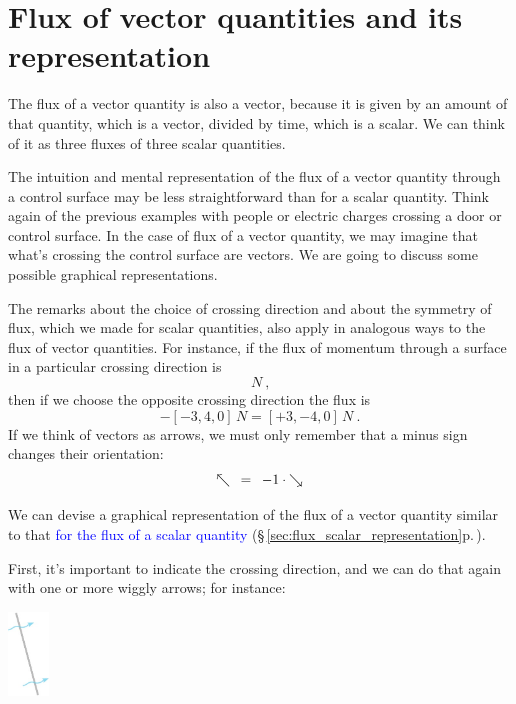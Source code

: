 \documentclass[a4paper,12pt,%
onecolumn,oneside,%
british%
]{memoir}
\renewcommand*{\|}[1][]{\nonscript\:#1\vert\nonscript\:\mathopen{}}
\newcommand*{\sect}{\S}%
\renewcommand*{\autoref}[3][\sect\,\ref]{\textcolor{blue}{#3} {\color{blue}\scriptsize(\faIcon[regular]{eye}\;#1{#2}\;p.\,\pageref{#2})}}
\begin{document}
\section{Flux of vector quantities and its representation}
\label{sec:intuition_fluxes_vector}

The flux of a vector quantity is also a vector, because it is given by an amount of that quantity, which is a vector, divided by time, which is a scalar. We can think of it as three fluxes of three scalar quantities.

The intuition and mental representation of the flux of a vector quantity through a control surface may be less straightforward than for a scalar quantity. Think again of the previous examples with people or electric charges crossing a door or control surface. In the case of flux of a vector quantity, we may imagine that what's crossing the control surface are vectors. We are going to discuss some possible graphical representations.

The remarks about the choice of crossing direction and about the symmetry of flux, which we made for scalar quantities, also apply in analogous ways to the flux of vector quantities. For instance, if the flux of momentum through a surface in a particular crossing direction is
\begin{equation*}
  [-3, 4, 0]\,\unit{N} \ ,
\end{equation*}
then if we choose the opposite crossing direction the flux is
\begin{equation*}
  -[-3, 4, 0]\,\unit{N} = [+3, -4, 0]\,\unit{N}\ .
\end{equation*}
If we think of vectors as arrows, we must only remember that a minus sign changes their orientation:\noprelistbreak
\begin{equation*}
  \mathord{\nwarrow} \mathrel{\enskip=\enskip} -1\cdot\mathord{\searrow}
\end{equation*}

\medskip

We can devise a graphical representation of the flux of a vector quantity similar to that \autoref{sec:flux_scalar_representation}{for the flux of a scalar quantity}.

First, it's important to indicate the crossing direction, and we can do that again with one or more wiggly arrows; for instance:\noprelistbreak
\begin{center}
  \medskip
  \includegraphics[height=6em]{images/surface_tilted_crossing.jpg}
\end{center}
\end{document}
